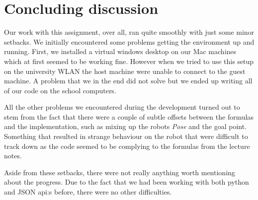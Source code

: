 \documentclass[12pt]{article}
\begin{document}
\section{Concluding discussion}

Our work with this assignment, over all, ran quite smoothly with just some minor
setbacks. We initially encountered some problems getting the environment up and
running. First, we installed a virtual windows desktop on our Mac machines which
at first seemed to be working fine. However when we tried to use this setup on
the university WLAN the host machine were unable to connect to the guest
machine. A problem that we in the end did not solve but we ended up writing all
of our code on the school computers.

All the other problems we encountered during the development turned out
to stem from the fact that there were a couple of subtle offsets between
the formulas and the implementation, such as mixing up the robots
\textit{Pose} and the goal point. Something that resulted in strange
behaviour on the robot that were difficult to track down as the code
seemed to be complying to the formulas from the lecture notes.

Aside from these setbacks, there were not really anything worth mentioning
about the progress. Due to the fact that we had been working with both python
and JSON api:s before, there were no other difficulties.




\newpage








\end{document}
